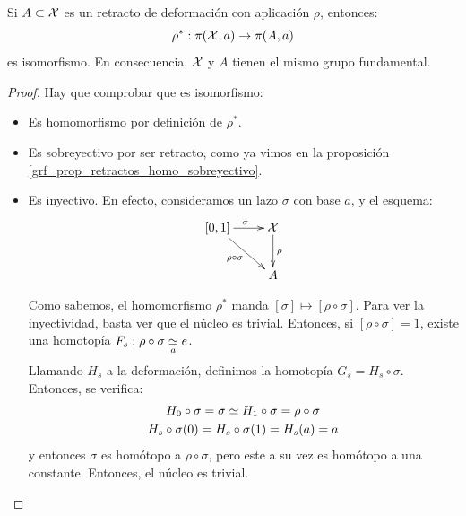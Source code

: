 \begin{theo}
	Si $A\subset\X$ es un retracto de deformación con aplicación $\rho$, entonces:
	\[\rho^*:\pi(\X,a)\to\pi(A,a)\]
	es isomorfismo. En consecuencia, $\X$ y $A$ tienen el mismo grupo fundamental.
	
	\begin{proof}
		Hay que comprobar que es isomorfismo:
		\begin{itemize}
			\item Es homomorfismo por definición de $\rho^*$.
			\item Es sobreyectivo por ser retracto, como ya vimos en la proposición \ref{grf_prop_retractos_homo_sobreyectivo}.
			\item Es inyectivo. En efecto, consideramos un lazo $\sigma$ con base $a$, y el esquema:
			\[\xymatrix{
				[0,1] \ar[r]^\sigma \ar[rd]_{\rho\circ\sigma} & \X \ar[d]^\rho \\
				& A
			}\]
			
			Como sabemos, el homomorfismo $\rho^*$ manda $[\sigma]\mapsto [\rho\circ\sigma]$. Para ver la inyectividad, basta ver que el núcleo es trivial. Entonces, si $[\rho\circ\sigma] = 1$, existe una homotopía $F_s:\rho\circ\sigma\homot[a] e$.
			
			Llamando $H_s$ a la deformación, definimos la homotopía $G_s=H_s\circ\sigma$. Entonces, se verifica:
			\begin{gather*}
				H_0\circ\sigma= \sigma \homot H_1\circ\sigma = \rho\circ\sigma \\
				H_s\circ\sigma(0) = H_s\circ\sigma(1) = H_s(a) = a
			\end{gather*}
			y entonces $\sigma$ es homótopo a $\rho\circ\sigma$, pero este a su vez es homótopo a una constante. Entonces, el núcleo es trivial. \qedhere  
		\end{itemize}
	\end{proof}
\end{theo}